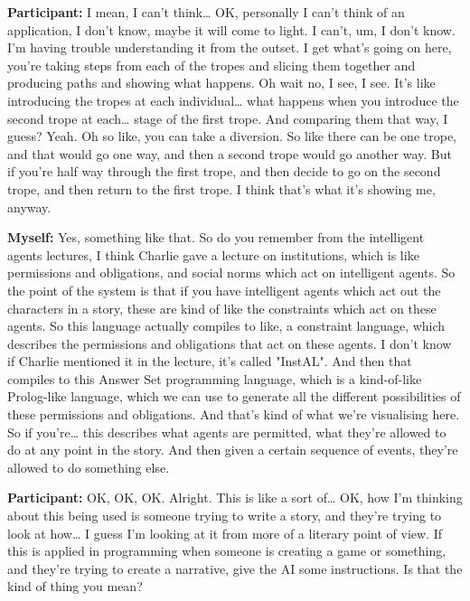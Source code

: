 \documentclass[11pt]{report}
\newcommand{\llabel}[1]{\hypertarget{llineno:#1}{\linelabel{#1}}}
\begin{document}
\begin{linenumbers}
\textbf{Participant:} I mean, I can't think\ldots{} OK, personally I can't think of an application, I don't know, maybe it will come to light. I can't, um, I don't know. I'm having trouble understanding it from the outset. I get what's going on here, you're taking steps from each of the tropes and slicing them together and producing paths and showing what happens. Oh wait no, I see, I see. It's like introducing the tropes at each individual\ldots{} what happens when you introduce the second trope at each\ldots{} stage of the first trope. And comparing them that way, I guess? Yeah. Oh so like, you can take a diversion. So like there can be one trope, and that would go one way, and then a second trope would go another way. But if you're half way through the first trope, and then decide to go on the second trope, and then return to the first trope. I think that's what it's showing me, anyway.\llabel{lne:use2e3}

\textbf{Myself:} Yes, something like that. So do you remember from the intelligent agents lectures, I think Charlie gave a lecture on institutions, which is like permissions and obligations, and social norms which act on intelligent agents. So the point of the system is that if you have intelligent agents which act out the characters in a story, these are kind of like the constraints which act on these agents. So this language actually compiles to like, a constraint language, which describes the permissions and obligations that act on these agents. I don't know if Charlie mentioned it in the lecture, it's called "InstAL". And then that compiles to this Answer Set programming language, which is a kind-of-like Prolog-like language, which we can use to generate all the different possibilities of these permissions and obligations. And that's kind of what we're visualising here. So if you're\ldots{} this describes what agents are permitted, what they're allowed to do at any point in the story. And then given a certain sequence of events, they're allowed to do something else.

\textbf{Participant:} OK, OK, OK. Alright. This is like a sort of\ldots{} OK, how I'm thinking about this being used is someone trying to write a story, and they're trying to look at how\ldots{} I guess I'm looking at it from more of a literary point of view. If this is applied in programming when someone is creating a game or something, and they're trying to create a narrative, give the AI some instructions. Is that the kind of thing you mean?


\end{linenumbers}
\end{document}
